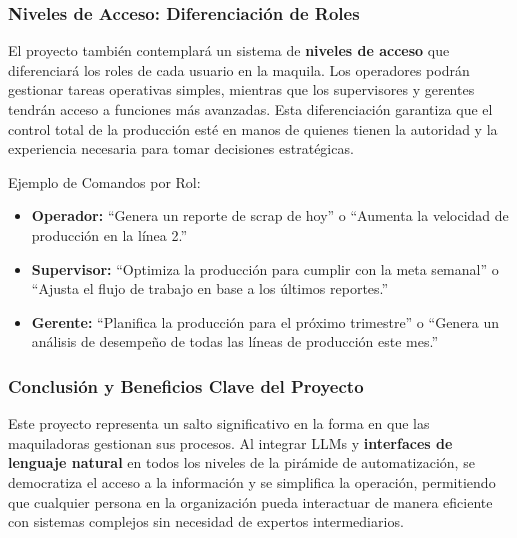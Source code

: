 \documentclass[
  10pt,
  letterpaper,
]{book}
\providecommand{\tightlist}{%
  \setlength{\itemsep}{0pt}\setlength{\parskip}{0pt}}\usepackage{longtable,booktabs,array}
\begin{document}
\subsubsection{Niveles de Acceso: Diferenciación de
Roles}\label{niveles-de-acceso-diferenciaciuxf3n-de-roles}

El proyecto también contemplará un sistema de \textbf{niveles de acceso}
que diferenciará los roles de cada usuario en la maquila. Los operadores
podrán gestionar tareas operativas simples, mientras que los
supervisores y gerentes tendrán acceso a funciones más avanzadas. Esta
diferenciación garantiza que el control total de la producción esté en
manos de quienes tienen la autoridad y la experiencia necesaria para
tomar decisiones estratégicas.

Ejemplo de Comandos por Rol:

\begin{itemize}
\tightlist
\item
  \textbf{Operador:} ``Genera un reporte de scrap de hoy'' o ``Aumenta
  la velocidad de producción en la línea 2.''
\item
  \textbf{Supervisor:} ``Optimiza la producción para cumplir con la meta
  semanal'' o ``Ajusta el flujo de trabajo en base a los últimos
  reportes.''
\item
  \textbf{Gerente:} ``Planifica la producción para el próximo
  trimestre'' o ``Genera un análisis de desempeño de todas las líneas de
  producción este mes.''
\end{itemize}

\subsubsection{Conclusión y Beneficios Clave del
Proyecto}\label{conclusiuxf3n-y-beneficios-clave-del-proyecto}

Este proyecto representa un salto significativo en la forma en que las
maquiladoras gestionan sus procesos. Al integrar LLMs y
\textbf{interfaces de lenguaje natural} en todos los niveles de la
pirámide de automatización, se democratiza el acceso a la información y
se simplifica la operación, permitiendo que cualquier persona en la
organización pueda interactuar de manera eficiente con sistemas
complejos sin necesidad de expertos intermediarios.
\end{document}
